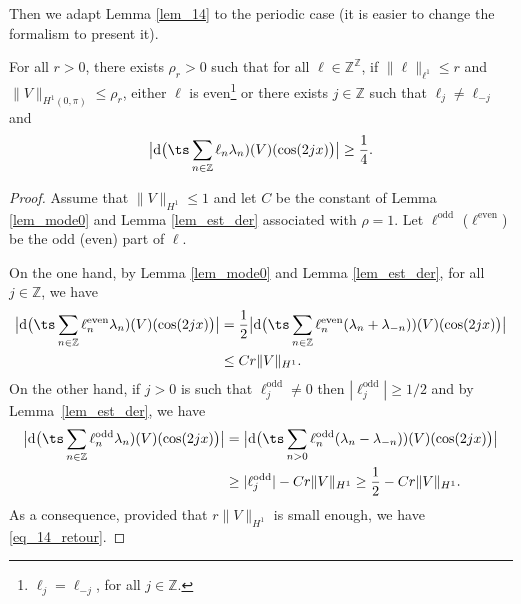 Then we adapt Lemma \ref{lem_14} to the periodic case (it is easier to change the formalism to present it).
\begin{lemma}
\label{lem_14_per}
For all $r>0$, there exists $\rho_r>0$ such that for all $\ell \in \mathbb{Z}^{\mathbb{Z}} $, if $\|\ell\|_{\ell^1}\leq r$ and $\|V\|_{H^1(0,\pi)}\leq \rho_r$, either $\ell$ is even\footnote{\ie $\ell_j=\ell_{-j}$, for all $j\in \mathbb{Z}$.} or there exists $j\in\mathbb{Z}$ such that $\ell_j \neq \ell_{-j}$ and%
\begin{equation}
\label{eq_14_retour}
\bigl|\mathrm{d}\bigl(\ts\sum_{n \in \mathbb{Z}} \ell_n \lambda_n)(V)(\cos(2jx)\bigr) \bigr| \geq \dfrac14.
\end{equation}
\end{lemma}
\begin{proof} Assume that $\|V\|_{H^1}\leq 1$ and let $C$ be the constant of Lemma \ref{lem_mode0} and Lemma \ref{lem_est_der} associated with $\rho =1$.
Let $\ell^{\mathrm{odd}}$ (\resp $\ell^{\mathrm{even}}$) be the odd (\resp even) part of $\ell$.

On the one hand, by Lemma \ref{lem_mode0} and Lemma \ref{lem_est_der}, for all $j\in \mathbb{Z}$, we have
\begin{equation*}
\begin{split}
\bigl |\mathrm{d} \bigl(\ts\sum_{n \in \mathbb{Z}} \ell_n^{\mathrm{even}} \lambda_n)(V)(\cos(2jx) \bigr) \bigr| &=\frac12 \bigl |\mathrm{d} \bigl(\ts\sum_{n \in \mathbb{Z}} \ell_n^{\mathrm{even}} (\lambda_n+\lambda_{-n}))(V)(\cos(2jx) \bigr) \bigr| \\ &\leq C r \|V\|_{H^1}.
\end{split}
\end{equation*}
On the other hand, if $j>0$ is such that $\ell^{\mathrm{odd}}_j \neq 0$ then $|\ell^{\mathrm{odd}}_j|\geq 1/2$ and by Lemma~\ref{lem_est_der}, we have
\begin{equation*}
\begin{split}
\bigl |\mathrm{d} \bigl(\ts\sum_{n \in \mathbb{Z}} \ell_n^{\mathrm{odd}} \lambda_n)(V)(\cos(2jx) \bigr) \bigr | &= \bigl |\mathrm{d} \bigl(\ts\sum_{n >0} \ell_n^{\mathrm{odd}} (\lambda_n-\lambda_{-n}))(V)(\cos(2jx) \bigr) \bigr| \\ &\geq |\ell^{\mathrm{odd}}_j | - Cr \| V\|_{H^1} \geq \frac12 - Cr \| V\|_{H^1}.
\end{split}
\end{equation*}
As a consequence, provided that $r \| V\|_{H^1}$ is small enough, we have \eqref{eq_14_retour}.
\end{proof}

